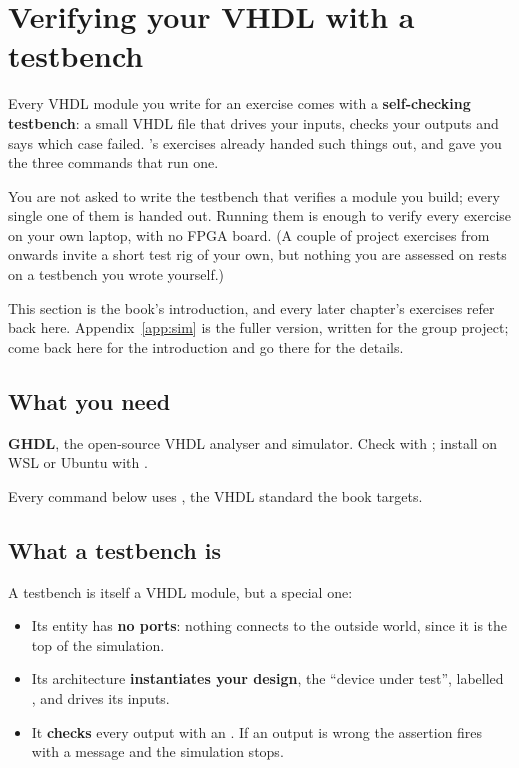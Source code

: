
\section{Verifying your VHDL with a testbench}
\label{c2:sec:testbenches}

Every VHDL module you write for an exercise comes with a \textbf{self-checking testbench}: a small
VHDL file that drives your inputs, checks your outputs and says which case failed.
's exercises already handed such things out, and  gave you the
three commands that run one.

You are not asked to write the testbench that verifies a module you build; every single one of them
is handed out. Running them is enough to verify every exercise on your own laptop, with no FPGA
board. (A couple of project exercises from  onwards invite a short test rig of your
own, but nothing you are assessed on rests on a testbench you wrote yourself.)

This section is the book's introduction, and every later chapter's exercises refer back here.
Appendix~\ref{app:sim} is the fuller version, written for the group project; come back here for the
introduction and go there for the details.

\subsection{What you need}
\label{c2:sub:need}
\textbf{GHDL}, the open-source VHDL analyser and simulator. Check with ;
install on WSL or Ubuntu with .

Every command below uses , the VHDL standard the book targets.

\subsection{What a testbench is}
\label{c2:sub:what}
A testbench is itself a VHDL module, but a special one:
\begin{itemize}
  \item Its entity has \textbf{no ports}: nothing connects to the outside world, since it is the
    top of the simulation.
  \item Its architecture \textbf{instantiates your design}, the ``device under test'', labelled
    , and drives its inputs.
  \item It \textbf{checks} every output with an . If an output is wrong the assertion
    fires with a message and the simulation stops.
\end{itemize}

